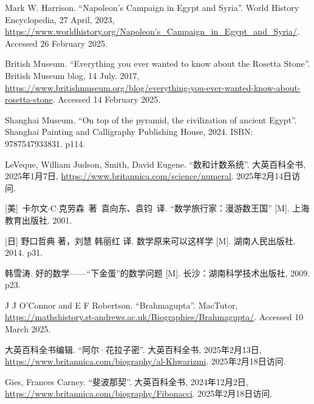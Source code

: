Mark W. Harrison. ``Napoleon's Campaign in Egypt and Syria''. World History Encyclopedia, 27 April, 2023, \url{https://www.worldhistory.org/Napoleon's_Campaign_in_Egypt_and_Syria/}. Accessed 26 February 2025.

British Museum. ``Everything you ever wanted to know about the Rosetta Stone''. British Museum blog, 14 July. 2017, \url{https://www.britishmuseum.org/blog/everything-you-ever-wanted-know-about-rosetta-stone}. Accessed 14 February 2025.

Shanghai Museum. ``On top of the pyramid, the civilization of ancient Egypt''. Shanghai Painting and Calligraphy Publishing House, 2024. ISBN: 9787547933831. p114.

LeVeque, William Judson, Smith, David Eugene. ``数和计数系统''. 大英百科全书, 2025年1月7日, \url{https://www.britannica.com/science/numeral}. 2025年2月14日访问.


[美]\ 卡尔文$\cdot$C$\cdot$克劳森\ 著\ 袁向东、袁钧\ 译. ``数学旅行家：漫游数王国'' [M]. 上海教育出版社. 2001. %

[日] 野口哲典 著，刘慧 韩丽红 译. 数学原来可以这样学 [M]. 湖南人民出版社. 2014. p31. %

韩雪涛. 好的数学——“下金蛋”的数学问题 [M]. 长沙：湖南科学技术出版社, 2009. p23. %

J J O'Connor and E F Robertson. ``Brahmagupta''. MacTutor, \url{https://mathshistory.st-andrews.ac.uk/Biographies/Brahmagupta/}. Accessed 10 March 2025.

大英百科全书编辑. ``阿尔·花拉子密''. 大英百科全书, 2025年2月13日, \url{https://www.britannica.com/biography/al-Khwarizmi}. 2025年2月18日访问.


Gies, Frances Carney. ``斐波那契''. 大英百科全书, 2024年12月2日, \url{https://www.britannica.com/biography/Fibonacci}. 2025年2月18日访问.
